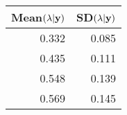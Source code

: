 \begin{table}[ht]
\centering
\begin{tabular}{rr}
  \hline
Mean$(\lambda | \mathbf{y})$ & SD$(\lambda | \mathbf{y})$ \\ 
  \hline
0.332 & 0.085 \\ 
  0.435 & 0.111 \\ 
  0.548 & 0.139 \\ 
  0.569 & 0.145 \\ 
   \hline
\end{tabular}
\end{table}
